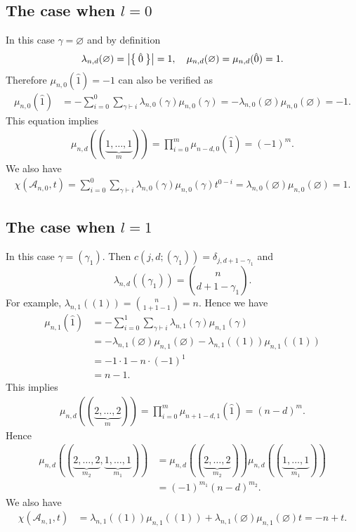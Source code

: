 \documentclass{wstmp}
\begin{document}
\subsection{The case when $l=0$}
In this case $\gamma={\varnothing}$  
and by definition 
\[
\lambda_{n,d}({\varnothing})={\left|{\Set{\hat{0}}}\right|}=1, \quad
\mu_{n,d}({\varnothing})=\mu_{n,d}({\hat{0}})=1.
\]
Therefore 
$\mu_{n,0}({\hat{1}})=-1$ can also be verified as
\begin{align*}
\mu_{n,0}({\hat{1}})
&=-\sum_{i=0}^{0}\sum_{\gamma{\vdash} i}\lambda_{n,0}(\gamma)\mu_{n,0}(\gamma)
=-\lambda_{n,0}({\varnothing})\mu_{n,0}({\varnothing})=-1.
\end{align*}
This equation implies
\begin{align*}
\mu_{n,d}((\underbrace{1,\ldots,1}_{m}))=
\prod_{i=0}^{m} \mu_{n-d,0}({\hat{1}})=(-1)^m.
\end{align*}
We also have
\begin{align*}
\chi({\mathcal{A}}_{n,0},t)
=
\sum_{i=0}^0 \sum_{\gamma{\vdash} i}
\lambda_{n,0}(\gamma)\mu_{n,0}(\gamma)t^{0-i}
=\lambda_{n,0}({\varnothing})\mu_{n,0}({\varnothing})=1.
\end{align*}

\subsection{The case when $l=1$}
In this case $\gamma=(\gamma_1)$. Then
$c(j,d;(\gamma_1))=\delta_{j,d+1-\gamma_1}$ and
\[
\lambda_{n,d}((\gamma_1))=\binom{n}{d+1-\gamma_1}.
\]
For example, $\lambda_{n,1}((1))=\binom{n}{1+1-1}=n$.
Hence we have
\begin{align*}
\mu_{n,1}({\hat{1}})
&=-\sum_{i=0}^{1}\sum_{\gamma{\vdash} i} \lambda_{n,1}(\gamma)\mu_{n,1}(\gamma)\\
&=-\lambda_{n,1}({\varnothing})\mu_{n,1}({\varnothing})
-\lambda_{n,1}((1))\mu_{n,1}((1))\\
&=-1\cdot 1 -n\cdot (-1)^1\\
&=n-1.
\end{align*}
This implies
\begin{align*}
\mu_{n,d}((\underbrace{2,\ldots,2}_{m}))=
\prod_{i=0}^{m} \mu_{n+1-d,1}({\hat{1}})=(n-d)^m.
\end{align*}
Hence
\begin{align*}
\mu_{n,d}((\underbrace{2,\ldots,2}_{m_2},\underbrace{1,\ldots,1}_{m_1}))
&=\mu_{n,d}((\underbrace{2,\ldots,2}_{m_2}))\mu_{n,d}((\underbrace{1,\ldots,1}_{m_1}))\\
&=(-1)^{m_1}(n-d)^{m_2}.
\end{align*}
We also have
\begin{align*}
\chi({\mathcal{A}}_{n,1},t)
&=
\lambda_{n,1}((1))\mu_{n,1}((1))+
\lambda_{n,1}({\varnothing})\mu_{n,1}({\varnothing})t
=-n+t.
\end{align*}
\end{document}
